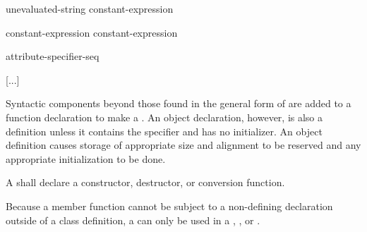 \documentclass{wg21}
\begin{document}
\begin{addedblock}
\begin{bnf}
    \br
        unevaluated-string\br
        constant-expression\br
\end{bnf}
\end{addedblock}

\begin{bnf}
    \br
     \terminal{(} constant-expression \terminal{)} \terminal{;}\br
     \terminal{(} constant-expression \terminal{,}  \terminal{)} \terminal{;}\br
\end{bnf}

\begin{bnf}
    \br
    \terminal{;}
\end{bnf}

\begin{bnf}
    \br
    attribute-specifier-seq \terminal{;}
\end{bnf}



\pnum
{}%

\textcolor{noteclr}{[...]}

\pnum
{}%
Syntactic components beyond those found in the general form of
 are added to a function declaration to make a
. An object declaration, however, is also
a definition unless it contains the  specifier and has no
initializer.
%
An object definition causes storage of appropriate size and alignment to be reserved and
any appropriate initialization to be done.

\pnum
A  shall declare a
constructor, destructor, or conversion function.
\begin{note}
 Because a member function cannot be subject to a non-defining declaration
 outside of a class definition, a 
 can only be used in a ,
 , or
 .
\end{note}
\end{document}
